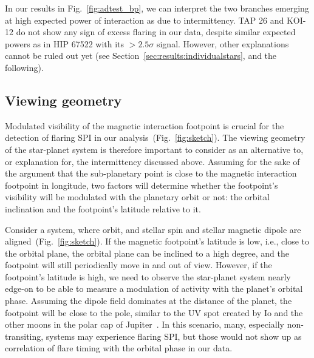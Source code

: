 \documentclass[twocolumn]{aastex631}
\begin{document}
In our results in Fig.~\ref{fig:adtest_bp}, we can interpret the two branches emerging at high expected power of interaction as due to intermittency. TAP 26 and KOI-12 do not show any sign of excess flaring in our data, despite similar expected powers as in HIP 67522 with its $>2.5\sigma$ signal. However, other explanations cannot be ruled out yet (see Section~\ref{sec:results:individualstars}, and the following).


\subsection{Viewing geometry}
\label{sec:discussion:viewing}
Modulated visibility of the magnetic interaction footpoint is crucial for the detection of flaring SPI in our analysis~(Fig.~\ref{fig:sketch}). The viewing geometry of the star-planet system is therefore important to consider as an alternative to, or explanation for, the intermittency discussed above. Assuming for the sake of the argument that the sub-planetary point is close to the magnetic interaction footpoint in longitude, two factors will determine whether the footpoint's visibility will be modulated with the planetary orbit or not: the orbital inclination and the footpoint's latitude relative to it. 

Consider a system, where orbit, and stellar spin and stellar magnetic dipole are aligned~(Fig.~\ref{fig:sketch}). If the magnetic footpoint's latitude is low, i.e., close to the orbital plane, the orbital plane can be inclined to a high degree, and the footpoint will still periodically move in and out of view. However, if the footpoint's latitude is high, we need to observe the star-planet system nearly edge-on to be able to measure a modulation of activity with the planet's orbital phase. Assuming the dipole field dominates at the distance of the planet, the footpoint will be close to the pole, similar to the UV spot created by Io and the other moons in the polar cap of Jupiter~\citep{clarke1996farultraviolet, prange1996rapid}. In this scenario, many, especially non-transiting, systems may experience flaring SPI, but those would not show up as correlation of flare timing with the orbital phase in our data.
\end{document}
